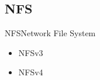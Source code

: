 \documentclass[pdflatex, ngerman]{beamer}
\begin{document}
\subsection{NFS}

\begin{frame}{NFS}{Network File System}
\begin{block}{}
  \begin{itemize}
    \item NFSv3
    \item NFSv4
  \end{itemize}
\end{block}
\end{frame}

\end{document}
